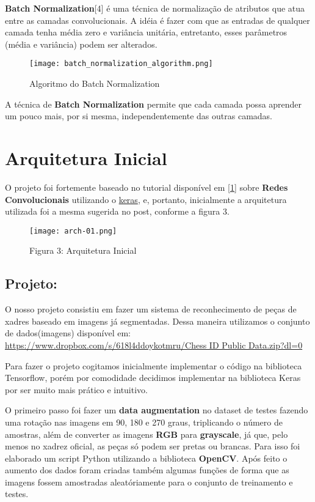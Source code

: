 \textbf{Batch Normalization}[4] é uma técnica de normalização de atributos que atua
entre as camadas convolucionais. A idéia é fazer com que as entradas de qualquer
camada tenha média zero e variância unitária, entretanto, esses parâmetros
(média e variância) podem ser alterados.

\begin{figure}[ht]
\centering
\texttt{[image: batch\_normalization\_algorithm.png]}
\caption{Algoritmo do Batch Normalization}
\end{figure}


A técnica de \textbf{Batch Normalization} permite que cada camada possa aprender
um pouco mais, por si mesma, independentemente das outras camadas.

    \section{Arquitetura Inicial}\label{arquitetura-inicial}

O projeto foi fortemente baseado no tutorial disponível em
\href{http://adventuresinmachinelearning.com/keras-tutorial-cnn-11-lines/}{[1]} sobre \textbf{Redes
Convolucionais} utilizando o \href{https://keras.io/}{keras}, e, portanto, inicialmente a
arquitetura utilizada foi a mesma sugerida no post, conforme a figura 3.

\begin{figure}[ht]
\centering
\texttt{[image: arch-01.png]}
\caption{Figura 3: Arquitetura Inicial}
\end{figure}


    \subsection{Projeto:}\label{projeto}

O nosso projeto consistiu em fazer um sistema de reconhecimento de peças
de xadres baseado em imagens já segmentadas. Dessa maneira utilizamos o
conjunto de dados(imagens) disponível em:
\href{https://www.dropbox.com/s/618l4ddoykotmru/Chess\%20ID\%20Public\%20Data.zip?dl=0}{
https://www.dropbox.com/s/618l4ddoykotmru/Chess ID Public Data.zip?dl=0}

Para fazer o projeto cogitamos inicialmente implementar o código na
biblioteca Tensorflow, porém por comodidade decidimos implementar na
biblioteca Keras por ser muito mais prático e intuitivo.

O primeiro passo foi fazer um \textbf{data augmentation} no dataset de
testes fazendo uma rotação nas imagens em 90, 180 e 270 graus,
triplicando o número de amostras, além de converter as imagens
\textbf{RGB} para \textbf{grayscale}, já que, pelo menos no xadrez
oficial, as peças só podem ser pretas ou brancas. Para isso foi
elaborado um script Python utilizando a biblioteca \textbf{OpenCV}. Após
feito o aumento dos dados foram criadas também algumas funções de forma
que as imagens fossem amostradas aleatóriamente para o conjunto de
treinamento e testes.

